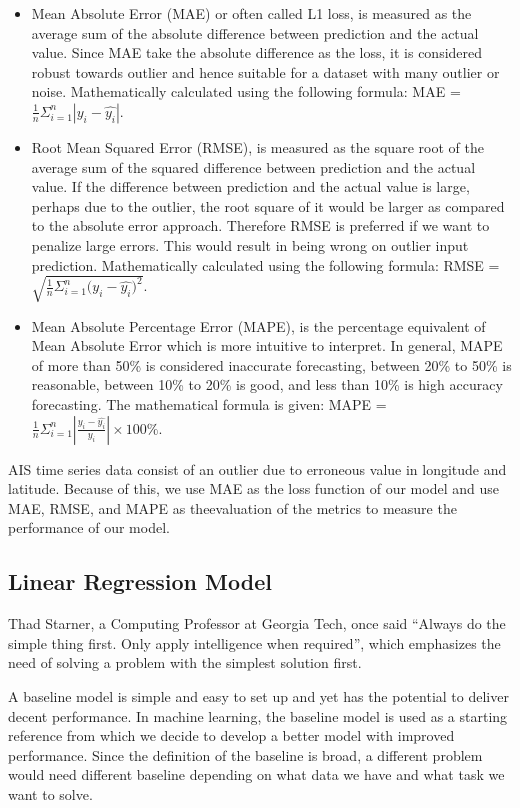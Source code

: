 \begin{itemize}
    \item Mean Absolute Error (MAE) or often called L1 loss, is measured as the average sum of the absolute difference between prediction and the actual value. Since MAE take the absolute difference as the loss, it is considered robust towards outlier and hence suitable for a dataset with many outlier or noise. Mathematically calculated using the following formula: MAE = $\frac{1}{n}\Sigma_{i=1}^{n}{|y_i - \hat{y_i}|}$.
    \item Root Mean Squared Error (RMSE), is measured as the square root of the average sum of the squared difference between prediction and the actual value. If the difference between prediction and the actual value is large, perhaps due to the outlier, the root square of it would be larger as compared to the absolute error approach. Therefore RMSE is preferred if we want to penalize large errors. This would result in being wrong on outlier input prediction. Mathematically calculated using the following formula: RMSE = $\sqrt{\frac{1}{n}\Sigma_{i=1}^{n}{\Big(y_i - \hat{y_i}\Big)^2}}$.
    \item Mean Absolute Percentage Error (MAPE), is the percentage equivalent of Mean Absolute Error which is more intuitive to interpret. In general, MAPE of more than 50\% is considered inaccurate forecasting, between 20\% to 50\% is reasonable, between 10\% to 20\% is good, and less than 10\% is high accuracy forecasting. The mathematical formula is given:
    MAPE = $\frac{1}{n}\Sigma_{i=1}^{n}{|\frac{y_i - \hat{y_i}}{y_i}|} \times 100\%$.
\end{itemize}

AIS time series data consist of an outlier due to erroneous value in longitude and latitude. Because of this, we use MAE as the loss function of our model and use MAE, RMSE, and MAPE as theevaluation of the metrics to measure the performance of our model.

\subsection{Linear Regression Model}
Thad Starner, a Computing Professor at Georgia Tech, once said ``Always do the simple thing first. Only apply intelligence when required'', which emphasizes the need of solving a problem with the simplest solution first.

A baseline model is simple and easy to set up and yet has the potential to deliver decent performance. In machine learning, the baseline model is used as a starting reference from which we decide to develop a better model with improved performance. Since the definition of the baseline is broad, a different problem would need different baseline depending on what data we have and what task we want to solve.

